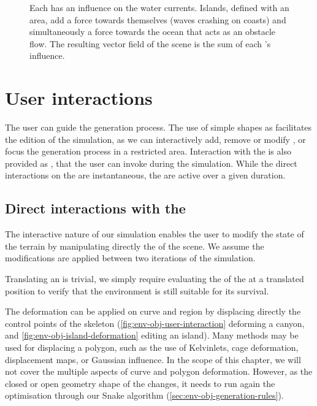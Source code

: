 \begin{figure}
    \caption{Each  has an influence on the water currents. Islands, defined with an area, add a force towards themselves (waves crashing on coasts) and simultaneously a force towards the ocean that acts as an obstacle flow. The resulting vector field of the scene is the sum of each 's influence.}
    \label{fig:env-obj-island-flowfield}
\end{figure}


\section{User interactions}
\label{sec:env-obj-interaction}
The user can guide the generation process. The use of simple shapes as  facilitates the edition of the simulation, as we can interactively add, remove or modify , or focus the generation process in a restricted area. Interaction with the  is also provided as , that the user can invoke during the simulation. While the direct interactions on the  are instantaneous, the  are active over a given duration.

\subsection{Direct interactions with the }
\label{sec:env-obj-manual-interaction}
The interactive nature of our simulation enables the user to modify the state of the terrain by manipulating directly the  of the scene. We assume the modifications are applied between two iterations of the simulation.

Translating an  is trivial, we simply require evaluating the  of the  at a translated position to verify that the environment is still suitable for its survival.

The deformation  can be applied on curve and region  by displacing directly the control points of the skeleton (\cref{fig:env-obj-user-interaction} deforming a canyon, and \cref{fig:env-obj-island-deformation} editing an island). Many methods may be used for displacing a polygon, such as the use of Kelvinlets, cage deformation, displacement maps, or Gaussian influence. In the scope of this chapter, we will not cover the multiple aspects of curve and polygon deformation. However, as the closed or open geometry shape of the  changes, it needs to run again the  optimisation through our Snake algorithm (\cref{sec:env-obj-generation-rules}).

